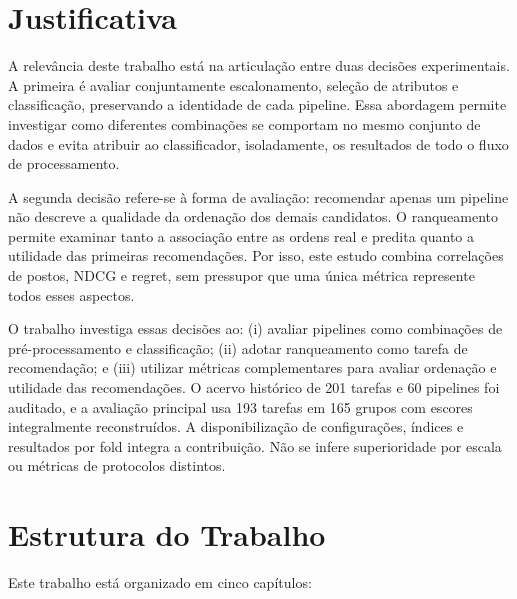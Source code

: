 \section{Justificativa}\label{sec:justificativa}

A relevância deste trabalho está na articulação entre duas decisões experimentais. A primeira é avaliar conjuntamente escalonamento, seleção de atributos e classificação, preservando a identidade de cada pipeline. Essa abordagem permite investigar como diferentes combinações se comportam no mesmo conjunto de dados e evita atribuir ao classificador, isoladamente, os resultados de todo o fluxo de processamento.

A segunda decisão refere-se à forma de avaliação: recomendar apenas um pipeline não descreve a qualidade da ordenação dos demais candidatos. O ranqueamento permite examinar tanto a associação entre as ordens real e predita quanto a utilidade das primeiras recomendações. Por isso, este estudo combina correlações de postos, NDCG e regret, sem pressupor que uma única métrica represente todos esses aspectos.

O trabalho investiga essas decisões ao: (i) avaliar pipelines como combinações de pré-processamento e classificação; (ii) adotar ranqueamento como tarefa de recomendação; e (iii) utilizar métricas complementares para avaliar ordenação e utilidade das recomendações. O acervo histórico de 201 tarefas e 60 pipelines foi auditado, e a avaliação principal usa 193 tarefas em 165 grupos com escores integralmente reconstruídos. A disponibilização de configurações, índices e resultados por fold integra a contribuição. Não se infere superioridade por escala ou métricas de protocolos distintos.


\section{Estrutura do Trabalho}\label{sec:estruturaTrabalho}

Este trabalho está organizado em cinco capítulos:

